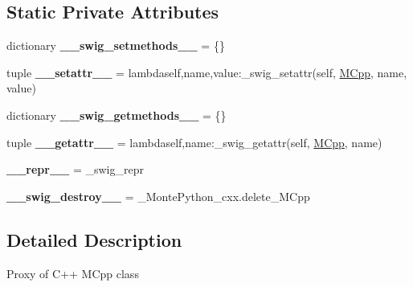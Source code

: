 \subsection*{Static Private Attributes}
\begin{DoxyCompactItemize}
\item 
\hypertarget{classMontePython__cxx_1_1MCpp_aa521d7f25cca587284a98466e024a361}{}dictionary {\bfseries \+\_\+\+\_\+swig\+\_\+setmethods\+\_\+\+\_\+} = \{\}\label{classMontePython__cxx_1_1MCpp_aa521d7f25cca587284a98466e024a361}

\item 
\hypertarget{classMontePython__cxx_1_1MCpp_a748284d77f8e673ab6e2f674aa5f6574}{}tuple {\bfseries \+\_\+\+\_\+setattr\+\_\+\+\_\+} = lambdaself,name,value\+:\+\_\+swig\+\_\+setattr(self, \hyperlink{classMontePython__cxx_1_1MCpp}{M\+Cpp}, name, value)\label{classMontePython__cxx_1_1MCpp_a748284d77f8e673ab6e2f674aa5f6574}

\item 
\hypertarget{classMontePython__cxx_1_1MCpp_a9782d8e30015bd2826dd4904cd949679}{}dictionary {\bfseries \+\_\+\+\_\+swig\+\_\+getmethods\+\_\+\+\_\+} = \{\}\label{classMontePython__cxx_1_1MCpp_a9782d8e30015bd2826dd4904cd949679}

\item 
\hypertarget{classMontePython__cxx_1_1MCpp_a56876d4f05de60f58b63f255dc5c8c96}{}tuple {\bfseries \+\_\+\+\_\+getattr\+\_\+\+\_\+} = lambdaself,name\+:\+\_\+swig\+\_\+getattr(self, \hyperlink{classMontePython__cxx_1_1MCpp}{M\+Cpp}, name)\label{classMontePython__cxx_1_1MCpp_a56876d4f05de60f58b63f255dc5c8c96}

\item 
\hypertarget{classMontePython__cxx_1_1MCpp_a02757e15e2c73d255380baa1143f5ed2}{}{\bfseries \+\_\+\+\_\+repr\+\_\+\+\_\+} = \+\_\+swig\+\_\+repr\label{classMontePython__cxx_1_1MCpp_a02757e15e2c73d255380baa1143f5ed2}

\item 
\hypertarget{classMontePython__cxx_1_1MCpp_a987efd141ade26c375ba1540633ad561}{}{\bfseries \+\_\+\+\_\+swig\+\_\+destroy\+\_\+\+\_\+} = \+\_\+\+Monte\+Python\+\_\+cxx.\+delete\+\_\+\+M\+Cpp\label{classMontePython__cxx_1_1MCpp_a987efd141ade26c375ba1540633ad561}

\end{DoxyCompactItemize}


\subsection{Detailed Description}
\begin{DoxyVerb}Proxy of C++ MCpp class\end{DoxyVerb}
 

